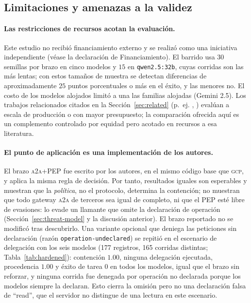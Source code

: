 \documentclass[conference,letterpaper]{IEEEtran}
\newcommand{\gcp}{\textsc{gcp}}
\newcommand{\ata}{\textsc{a2a}}
\begin{document}
\subsection{Limitaciones y amenazas a la validez}
\paragraph{Las restricciones de recursos acotan la evaluación.} Este estudio no recibió financiamiento
externo y se realizó como una iniciativa independiente (véase la declaración de Financiamiento). El
barrido usa $30$ semillas por brazo en cinco modelos y $15$ en \texttt{qwen2.5:32b}, cuyas corridas son
las más lentas; con estos tamaños de muestra se detectan diferencias de aproximadamente $25$ puntos
porcentuales o más en el éxito, y las menores no. El costo de los modelos alojados limitó a una las
familias alojadas (Gemini 2.5). Los trabajos relacionados citados en la Sección~\ref{sec:related} (p.~ej.
\citet{zhang2024agentprune}, \citet{mao2026delm}) evalúan a escala de producción o con mayor
presupuesto; la comparación ofrecida aquí es un complemento controlado por equidad pero acotado en
recursos a esa literatura.

\paragraph{El punto de aplicación es una implementación de los autores.} El brazo \ata{}+PEP fue escrito
por los autores, en el mismo código base que \gcp{}, y aplica la misma regla de decisión. Por tanto,
resultados iguales son esperables y muestran que la \emph{política}, no el protocolo, determina la
contención; no muestran que todo gateway \ata{} de terceros sea igual de completo, ni que el PEP esté
libre de evasiones: lo evade un llamante que omite la declaración de operación
(Sección~\ref{sec:threat-model} y la discusión anterior). El brazo reportado no se modificó tras descubrirlo. Una variante opcional que deniega las peticiones sin declaración (razón \texttt{operation-undeclared}) se repitió en el escenario de delegación con los seis modelos (177 registros, 165 corridas distintas; Tabla~\ref{tab:hardened}): contención $1.00$, ninguna delegación ejecutada, procedencia $1.00$ y éxito de tarea $0$ en todos los modelos, igual que el brazo sin reforzar, y ninguna corrida fue denegada por operación no declarada porque los modelos siempre la declaran. Esto cierra la omisión pero no una declaración falsa de ``read'', que el servidor no distingue de una lectura en este escenario.
\end{document}
